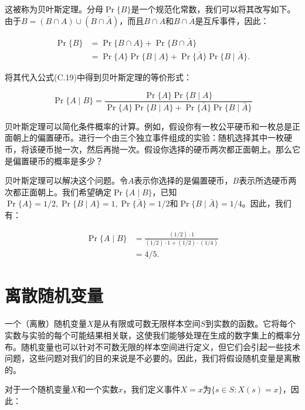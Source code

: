 \documentclass[lang=cn,newtx,10pt,scheme=chinese]{elegantbook}
\begin{document}
这被称为贝叶斯定理。分母$\operatorname{Pr}\{B\}$是一个规范化常数，我们可以将其改写如下。由于$B=(B \cap A) \cup(B \cap \bar{A})$，而且$B \cap A$和$B \cap \bar{A}$是互斥事件，因此：

$$
\begin{aligned}
\operatorname{Pr}\{B\} & =\operatorname{Pr}\{B \cap A\}+\operatorname{Pr}\{B \cap \bar{A}\} \\
& =\operatorname{Pr}\{A\} \operatorname{Pr}\{B \mid A\}+\operatorname{Pr}\{\bar{A}\} \operatorname{Pr}\{B \mid \bar{A}\} .
\end{aligned}
$$

将其代入公式(C.19)中得到贝叶斯定理的等价形式：

$$
\operatorname{Pr}\{A \mid B\}=\frac{\operatorname{Pr}\{A\} \operatorname{Pr}\{B \mid A\}}{\operatorname{Pr}\{A\} \operatorname{Pr}\{B \mid A\}+\operatorname{Pr}\{\bar{A}\} \operatorname{Pr}\{B \mid \bar{A}\}}
$$

贝叶斯定理可以简化条件概率的计算。例如，假设你有一枚公平硬币和一枚总是正面朝上的偏置硬币。进行一个由三个独立事件组成的实验：随机选择其中一枚硬币，将该硬币抛一次，然后再抛一次。假设你选择的硬币两次都正面朝上。那么它是偏置硬币的概率是多少？

贝叶斯定理可以解决这个问题。令$A$表示你选择的是偏置硬币，$B$表示所选硬币两次都正面朝上。我们希望确定$\operatorname{Pr}\{A \mid B\}$，已知$\operatorname{Pr}\{A\}=1 / 2, \operatorname{Pr}\{B \mid A\}=1, \operatorname{Pr}\{\bar{A}\}=1 / 2$和$\operatorname{Pr}\{B \mid \bar{A}\}=1 / 4$。因此，我们有：

$$
\begin{aligned}
\operatorname{Pr}\{A \mid B\} & =\frac{(1 / 2) \cdot 1}{(1 / 2) \cdot 1+(1 / 2) \cdot(1 / 4)} \\
& =4 / 5 .
\end{aligned}
$$

\section{离散随机变量}\label{section:C.3}

一个（离散）随机变量$X$是从有限或可数无限样本空间$S$到实数的函数。它将每个实数与实验的每个可能结果相关联，这使我们能够处理在生成的数字集上的概率分布。随机变量也可以针对不可数无限的样本空间进行定义，但它们会引起一些技术问题，这些问题对我们的目的来说是不必要的。因此，我们将假设随机变量是离散的。

对于一个随机变量$X$和一个实数$x$，我们定义事件$X=x$为$\{s \in S: X(s)=x\}$，因此：
\end{document}
